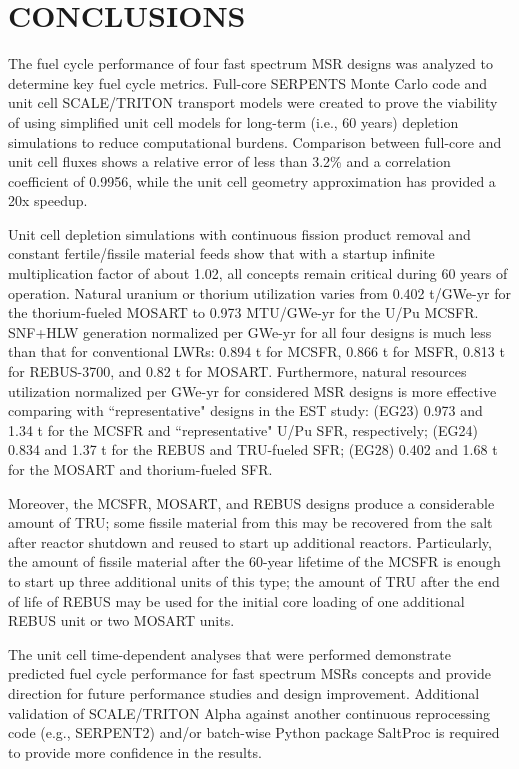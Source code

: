 \documentclass[letterpaper]{mandc2019}
\begin{document}
\section{CONCLUSIONS}
The fuel cycle performance of four fast spectrum \gls{MSR} designs was analyzed to determine key fuel cycle metrics. Full-core SERPENTS Monte Carlo code and unit cell SCALE/TRITON transport models were created to prove the viability of using simplified unit cell models for long-term (i.e., 60 years) depletion simulations to reduce computational burdens. Comparison between full-core and unit cell fluxes shows a relative error of less than 3.2\% and a correlation coefficient of 0.9956, while the unit cell geometry approximation has provided a 20x speedup.

Unit cell depletion simulations with continuous fission product removal and constant fertile/fissile material feeds show that with a startup infinite multiplication factor of about 1.02, all concepts remain critical during 60 years of operation. Natural uranium or thorium utilization varies from 0.402 t/GWe-yr for the thorium-fueled \gls{MOSART} to 0.973 MTU/GWe-yr for the U/Pu \gls{MCSFR}. \gls{SNF}+\gls{HLW} generation normalized per GWe-yr for all four designs is much less than that for conventional \glspl{LWR}: 0.894 t for \gls{MCSFR}, 0.866 t for \gls{MSFR}, 0.813 t for REBUS-3700, and 0.82 t for \gls{MOSART}. Furthermore, natural resources utilization normalized per GWe-yr for considered \gls{MSR} designs is more effective comparing with ``representative" designs in the EST study: (EG23) 0.973 and 1.34 t for the \gls{MCSFR} and ``representative" U/Pu \gls{SFR}, respectively; (EG24) 0.834 and 1.37 t for the REBUS and TRU-fueled \gls{SFR}; (EG28) 0.402 and 1.68 t for the \gls{MOSART} and thorium-fueled \gls{SFR}.

Moreover, the \gls{MCSFR}, \gls{MOSART}, and REBUS designs produce a considerable amount of \gls{TRU}; some fissile material from this may be recovered from the salt after reactor shutdown and reused to start up additional reactors. Particularly, the amount of fissile material after the 60-year lifetime of the \gls{MCSFR} is enough to start up three additional units of this type; the amount of \gls{TRU} after the end of life of REBUS may be used for the initial core loading of one additional REBUS unit or two \gls{MOSART} units. 

The unit cell time-dependent analyses that were performed demonstrate predicted fuel cycle performance for fast spectrum \glspl{MSR} concepts and provide direction for future performance studies and design improvement. Additional validation of SCALE/TRITON Alpha against another continuous reprocessing code (e.g., SERPENT2) and/or batch-wise Python package SaltProc \cite{rykhlevskii_advanced_2018} is required to provide more confidence in the results.
\end{document}
